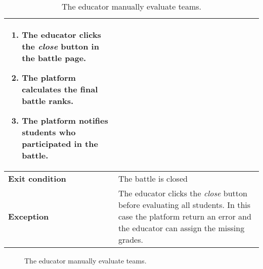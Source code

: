 \begin{enumerate}[label=\textbf{UC\arabic*}:,leftmargin=1.3cm]
\begin{table}[H]
\begin{tabular}{|l|p{11.9cm}|}
\begin{enumerate}[label=\arabic*.]
                      \item The educator clicks the \emph{close} button in the battle page.
                      \item The platform calculates the final battle ranks.
                      \item The platform notifies students who participated in the battle.
                  \end{enumerate}                 \\\hline
                  \textbf{Exit condition}  & The battle is closed                                                        \\\hline
                  \textbf{Exception}       & The educator clicks the \emph{close} button before evaluating all students.
                  In this case the platform return an error and the educator can assign the missing grades.              \\\hline
              \end{tabular}
              \caption{The educator manually evaluate teams.}
              \label{table:The educator manually evaluate teams}
          \end{table}

          \begin{figure}[H]
              \centering
              \caption{The educator manually evaluate teams.}
              \label{fig:The educator manually evaluate teams}
          \end{figure}

          \pagebreak


\end{enumerate}
